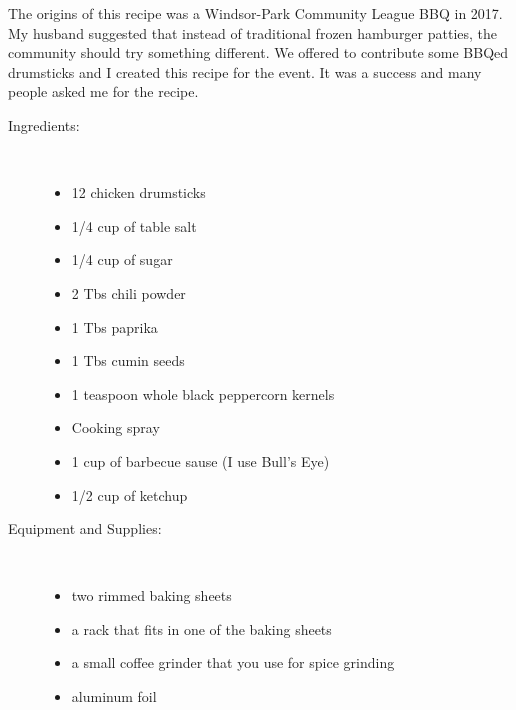 \documentclass[11pt,letterpaper]{article}
\begin{document}


The origins of this recipe was a Windsor-Park Community League BBQ in 2017. My husband suggested that instead of traditional frozen hamburger patties, the community should try something different. We offered to contribute some BBQed drumsticks and I created this recipe for the event. It was a success and many people asked me for the recipe.

\begin{description}

\item[Ingredients:]\ \\
	\begin{itemize}
	\item 12 chicken drumsticks
	\item 1/4 cup of table salt
	\item 1/4 cup of sugar
	\item 2 Tbs chili powder
	\item 1 Tbs paprika
	\item 1 Tbs cumin seeds
	\item 1 teaspoon whole black peppercorn kernels
	\item Cooking spray
	\item 1 cup of barbecue sause (I use Bull's Eye)
	\item 1/2 cup of ketchup
	\end{itemize}
\item[Equipment and Supplies:]\ \\
	\begin{itemize}
	\item two rimmed baking sheets 
	\item a rack that fits in one of the baking sheets
	\item a small coffee grinder that you use for spice grinding
	\item aluminum foil
	\end{itemize}


\end{description}
\end{document}
